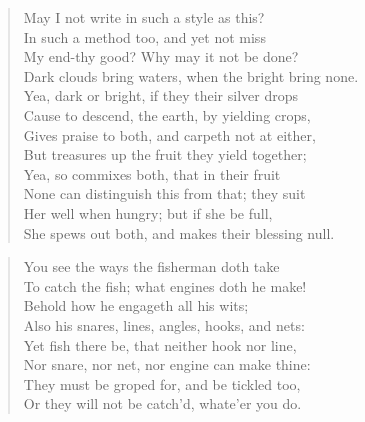 \begin{verse}
May I not write in such a style as this?\\
In such a method too, and yet not miss\\
My end-thy good? Why may it not be done?\\
Dark clouds bring waters, when the bright bring none.\\
Yea, dark or bright, if they their silver drops\\
Cause to descend, the earth, by yielding crops,\\
Gives praise to both, and carpeth not at either,\\
But treasures up the fruit they yield together;\\
Yea, so commixes both, that in their fruit\\
None can distinguish this from that; they suit\\
Her well when hungry; but if she be full,\\
She spews out both, and makes their blessing null.\\
\end{verse}
\begin{verse}
You see the ways the fisherman doth take\\
To catch the fish; what engines doth he make!\\
Behold how he engageth all his wits;\\
Also his snares, lines, angles, hooks, and nets:\\
Yet fish there be, that neither hook nor line,\\
Nor snare, nor net, nor engine can make thine:\\
They must be groped for, and be tickled too,\\
Or they will not be catch'd, whate'er you do.\\
\end{verse}
\newpage
